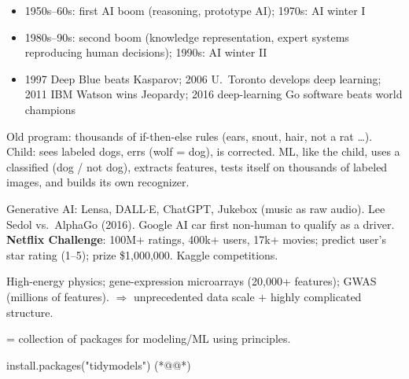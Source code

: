 \begin{itemize}
\item 1950s--60s: first AI boom (reasoning, prototype AI); 1970s: AI winter I
\item 1980s--90s: second boom (knowledge representation, expert systems reproducing human decisions); 1990s: AI winter II
\item 1997 Deep Blue beats Kasparov; 2006 U.~Toronto develops deep learning; 2011 IBM Watson wins Jeopardy; 2016 deep-learning Go software beats world champions
\end{itemize}

Old program: thousands of if-then-else rules (ears, snout, hair, not a rat \ldots). Child: sees labeled dogs, errs (wolf = dog), is corrected. ML, like the child, uses a classified  (dog / not dog), extracts features, tests itself on thousands of labeled images, and builds its own recognizer.

Generative AI: Lensa, DALL$\cdot$E, ChatGPT, Jukebox (music as raw audio). Lee Sedol vs.\ AlphaGo (2016). Google AI car first non-human to qualify as a driver.
\textbf{Netflix Challenge}: 100M+ ratings, 400k+ users, 17k+ movies; predict user's star rating (1--5); prize \$1,000,000. Kaggle competitions.

High-energy physics; gene-expression microarrays (20,000+ features); GWAS (millions of features). $\Rightarrow$ unprecedented data scale + highly complicated structure.

 = collection of packages for modeling/ML using  principles.
\begin{rcode}
install.packages("tidymodels")   (*@@*)
\end{rcode}

